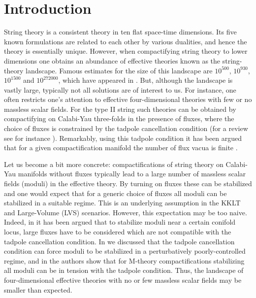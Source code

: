\documentclass[12pt,a4paper]{article}
\numberwithin{equation}{section}
\begin{document}

\section{Introduction}

String theory is a consistent theory in ten flat space-time dimensions. Its five known 
formulations are related to each other by various dualities, and hence the theory is essentially unique. 
However, when compactifying string theory to lower dimensions one obtains
an abundance of effective theories known as the string-theory landscape. 
Famous estimates for the size of this landscape are 
$10^{500}$, $10^{930}$, $10^{1500}$ and $10^{272000}$, 
which have appeared in 
\cite{Bousso:2000xa,Schellekens:2016hhf,Lerche:1986cx,Taylor:2015xtz}.
But, although the  landscape is vastly large, 
typically not all solutions are of interest to us. For instance, one often restricts one's 
attention to effective four-dimensional theories with few or no massless 
scalar fields. 
For the type II string such theories can be obtained  by 
compactifying on Calabi-Yau three-folds in the presence of 
fluxes, where the choice of fluxes  is 
constrained by the tadpole cancellation condition
(for a review see for instance \cite{Blumenhagen:2006ci}).
Remarkably, using this tadpole condition
it has been argued that for a given compactification manifold the number of flux vacua is finite 
 \cite{Grimm:2020cda,Bakker}. 


Let us become a bit more concrete:
compactifications of string theory on Calabi-Yau manifolds without fluxes 
typically lead  to a large number of massless scalar fields (moduli) 
in the effective theory. By turning on fluxes these can be stabilized  and one would 
expect that for a generic choice of fluxes all moduli can be 
stabilized in a suitable regime. This is an underlying assumption in the
KKLT \cite{Kachru:2003aw} and  
Large-Volume (LVS) \cite{Balasubramanian:2005zx} scenarios.
However, this expectation may be too naive. 
Indeed, in \cite{Bena:2018fqc} it has been argued that to 
stabilize moduli near a certain conifold locus, large fluxes have to be considered which are not 
compatible with the tadpole cancellation condition. 
In  \cite{Betzler:2019kon} we discussed that 
the tadpole cancellation condition can force moduli to be stabilized
in a perturbatively poorly-controlled regime, 
and in
\cite{Braun:2020jrx} the authors show that 
for M-theory compactifications stabilizing all moduli can be
in tension with the tadpole condition.
Thus, the landscape of four-dimensional effective theories 
with no or few massless scalar fields may be smaller than 
expected. 
\end{document}
